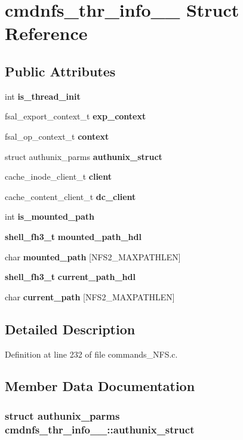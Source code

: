 \section{cmdnfs\_\-thr\_\-info\_\-\_\- Struct Reference}
\label{structcmdnfs__thr__info____}
\subsection*{Public Attributes}
\begin{DoxyCompactItemize}
\item 
int {\bf is\_\-thread\_\-init}
\item 
fsal\_\-export\_\-context\_\-t {\bf exp\_\-context}
\item 
fsal\_\-op\_\-context\_\-t {\bf context}
\item 
struct authunix\_\-parms {\bf authunix\_\-struct}
\item 
cache\_\-inode\_\-client\_\-t {\bf client}
\item 
cache\_\-content\_\-client\_\-t {\bf dc\_\-client}
\item 
int {\bf is\_\-mounted\_\-path}
\item 
{\bf shell\_\-fh3\_\-t} {\bf mounted\_\-path\_\-hdl}
\item 
char {\bf mounted\_\-path} [NFS2\_\-MAXPATHLEN]
\item 
{\bf shell\_\-fh3\_\-t} {\bf current\_\-path\_\-hdl}
\item 
char {\bf current\_\-path} [NFS2\_\-MAXPATHLEN]
\end{DoxyCompactItemize}


\subsection{Detailed Description}


Definition at line 232 of file commands\_\-NFS.c.

\subsection{Member Data Documentation}
\subsubsection[{authunix\_\-struct}]{\setlength{\rightskip}{0pt plus 5cm}struct authunix\_\-parms {\bf cmdnfs\_\-thr\_\-info\_\-\_\-::authunix\_\-struct}\hspace{0.3cm}{\ttfamily  [read]}}\label{structcmdnfs__thr__info_____ad38bb32013c0cfbfb38ea1a09beb1607}


